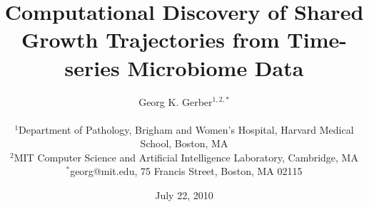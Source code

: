 \documentclass[11pt]{article}
\begin{document}
\title{\bf Computational Discovery of Shared Growth Trajectories from Time-series Microbiome Data}
\author{Georg K. Gerber$^{1,2,*}$ \\
\\
\small{$^{1}$Department of Pathology, Brigham and Women's Hospital, Harvard Medical School, Boston, MA} \\
\small{$^{2}$MIT Computer Science and
Artificial Intelligence Laboratory, Cambridge, MA} \\
\small{$^{*}$georg@mit.edu, 75 Francis Street, Boston, MA 02115}}
\date{July 22, 2010}
\maketitle
%

%
%
\end{document}
